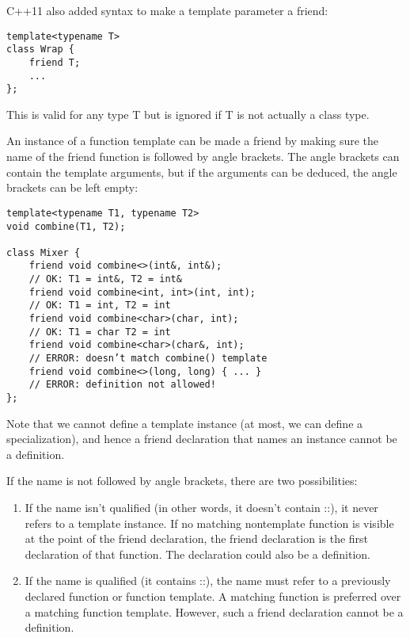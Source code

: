 C++11 also added syntax to make a template parameter a friend:

\begin{lstlisting}[style=styleCXX]
template<typename T>
class Wrap {
	friend T;
	...
};
\end{lstlisting}

This is valid for any type T but is ignored if T is not actually a class type.


An instance of a function template can be made a friend by making sure the name of the friend function is followed by angle brackets. The angle brackets can contain the template arguments, but if the arguments can be deduced, the angle brackets can be left empty:

\begin{lstlisting}[style=styleCXX]
template<typename T1, typename T2>
void combine(T1, T2);

class Mixer {
	friend void combine<>(int&, int&);
	// OK: T1 = int&, T2 = int&
	friend void combine<int, int>(int, int);
	// OK: T1 = int, T2 = int
	friend void combine<char>(char, int);
	// OK: T1 = char T2 = int
	friend void combine<char>(char&, int);
	// ERROR: doesn’t match combine() template
	friend void combine<>(long, long) { ... }
	// ERROR: definition not allowed!
};
\end{lstlisting}

Note that we cannot define a template instance (at most, we can define a specialization), and hence a friend declaration that names an instance cannot be a definition.

If the name is not followed by angle brackets, there are two possibilities:

\begin{enumerate}
\item 
If the name isn’t qualified (in other words, it doesn’t contain ::), it never refers to a template instance. If no matching nontemplate function is visible at the point of the friend declaration, the friend declaration is the first declaration of that function. The declaration could also be a definition.

\item 
If the name is qualified (it contains ::), the name must refer to a previously declared function or function template. A matching function is preferred over a matching function template. However, such a friend declaration cannot be a definition.
\end{enumerate}

